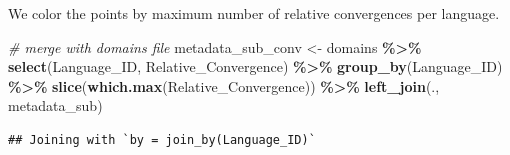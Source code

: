 \documentclass[
]{article}
\newenvironment{Shaded}{\begin{snugshade}}{\end{snugshade}}
\newcommand{\CommentTok}[1]{\textcolor[rgb]{0.56,0.35,0.01}{\textit{#1}}}
\newcommand{\FunctionTok}[1]{\textcolor[rgb]{0.13,0.29,0.53}{\textbf{#1}}}
\newcommand{\NormalTok}[1]{#1}
\newcommand{\OtherTok}[1]{\textcolor[rgb]{0.56,0.35,0.01}{#1}}
\newcommand{\SpecialCharTok}[1]{\textcolor[rgb]{0.81,0.36,0.00}{\textbf{#1}}}
\begin{document}
We color the points by maximum number of relative convergences per
language.

\begin{Shaded}
\begin{Highlighting}[]
\CommentTok{\# merge with domains file}
\NormalTok{metadata\_sub\_conv }\OtherTok{\textless{}{-}}\NormalTok{ domains }\SpecialCharTok{\%\textgreater{}\%}
  \FunctionTok{select}\NormalTok{(Language\_ID, Relative\_Convergence) }\SpecialCharTok{\%\textgreater{}\%}
  \FunctionTok{group\_by}\NormalTok{(Language\_ID) }\SpecialCharTok{\%\textgreater{}\%}
  \FunctionTok{slice}\NormalTok{(}\FunctionTok{which.max}\NormalTok{(Relative\_Convergence)) }\SpecialCharTok{\%\textgreater{}\%}
  \FunctionTok{left\_join}\NormalTok{(., metadata\_sub)}
\end{Highlighting}
\end{Shaded}

\begin{verbatim}
## Joining with `by = join_by(Language_ID)`
\end{verbatim}
\end{document}

